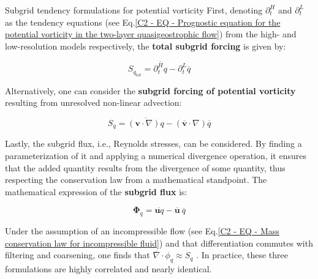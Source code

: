 \vspace{0.2em}
\begin{box_definition}{Subgrid tendency formulations for potential vorticity}
First, denoting $\partial_t^H$ and $\partial_t^L$ as the tendency equations (see Eq.\ref{C2 - EQ - Prognostic equation for the potential vorticity in the two-layer quasigeostrophic flow}) from the high- and low-resolution models respectively, the \textbf{total subgrid forcing} is given by:

\begin{equation}
S_{q_{\textit{tot}}}= \overline{\partial_t^H q} - \partial_t^L \overline{q}
\label{C2 - EQ - Total subgrid forcing}
\end{equation}
\vspace{-0.5em}

Alternatively, one can consider the \textbf{subgrid forcing of potential vorticity} resulting from unresolved non-linear advection:

\begin{equation}
S_{q}= \overline{(\mathbf{v} \cdot \nabla) q}  - (\overline{\mathbf{v}} \cdot \nabla) \overline{q}
\label{C2 - EQ - Subgrid forcing of non-linear advection}
\end{equation}
\vspace{-0.5em}

Lastly, the subgrid flux, i.e., Reynolds stresses, can be considered. By finding a parameterization of it and applying a numerical divergence operation, it ensures that the added quantity results from the divergence of some quantity, thus respecting the conservation law from a mathematical standpoint. The mathematical expression of the \textbf{subgrid flux} is:

\vspace{-1em}
\begin{equation}
\mathbf{\Phi}_q= \overline{\mathbf{u}q} - \overline{\mathbf{u}} \ \overline{q}
\label{C2 - EQ - Subgrid fluxes}
\end{equation}
\vspace{-0.5em}

Under the assumption of an incompressible flow (see Eq.\ref{C2 - EQ - Mass conservation law for incompressible fluid}) and that differentiation commutes with filtering and coarsening, one finds that $\overline{\nabla} \cdot \phi_q \approx S_q$ \citep{Benchmarking}. In practice, these three formulations are highly correlated and nearly identical.

\end{box_definition}

